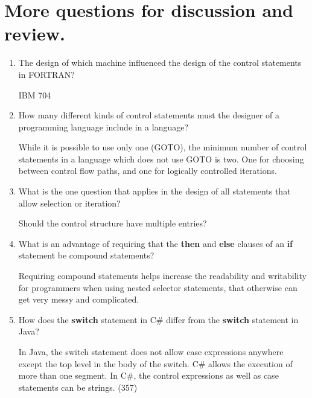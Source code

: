 \section{More questions for discussion and review.}

\begin{enumerate}
  \item The design of which machine influenced the design
    of the control statements in FORTRAN?
    
    \begin{answer}
    IBM 704
    \end{answer}

  \item How many different kinds of control statements
    must the designer of a programming language include
    in a language?
    
    \begin{answer}
    While it is possible to use only one (GOTO), the minimum number of control statements in a language which does not use GOTO is two. One for choosing between control flow paths, and one for logically controlled iterations.
    \end{answer}

  \item What is the one question that applies in the
    design of all statements that allow selection or
    iteration?
    
    \begin{answer}
Should the control structure have multiple entries? 
    \end{answer}

  \item What is an advantage of requiring that
    the \textbf{then} and \textbf{else} clauses of
    an \textbf{if} statement be compound statements?
    
    \begin{answer}
 Requiring compound statements helps increase the readability and writability for programmers when using nested selector statements, that otherwise can get very messy and complicated.
    \end{answer}

  \item How does the \textbf{switch} statement in C\#
    differ from the \textbf{switch} statement in Java?
    
    \begin{answer}
    In Java, the switch statement does not allow case expressions anywhere except the top level in the body of the switch.  C\#  allows the execution of more than one segment. In C\#, the control expressions as well as case statements can be strings. (357)
    

\end{answer}
\end{enumerate}
